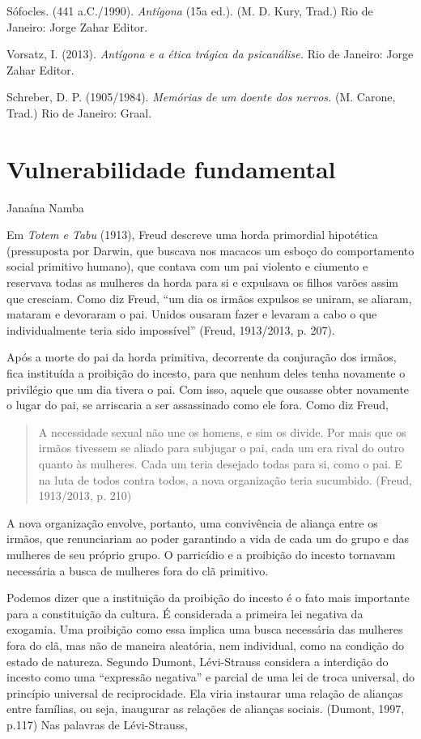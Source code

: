 Sófocles. (441 a.C./1990). \emph{Antígona} (15a ed.). (M. D. Kury,
Trad.) Rio de Janeiro: Jorge Zahar Editor.

Vorsatz, I. (2013). \emph{Antígona e a ética trágica da psicanálise.}
Rio de Janeiro: Jorge Zahar Editor.

Schreber, D. P. (1905/1984). \emph{Memórias de um doente dos nervos.}
(M. Carone, Trad.) Rio de Janeiro: Graal.



\chapter*{Vulnerabilidade fundamental}
Janaína Namba

Em \emph{Totem e Tabu} (1913), Freud descreve uma horda primordial
hipotética (pressuposta por Darwin, que buscava nos macacos um esboço do
comportamento social primitivo humano), que contava com um pai violento
e ciumento e reservava todas as mulheres da horda para si e expulsava os
filhos varões assim que cresciam. Como diz Freud, ``um dia os irmãos
expulsos se uniram, se aliaram, mataram e devoraram o pai. Unidos
ousaram fazer e levaram a cabo o que individualmente teria sido
impossível'' (Freud, 1913/2013, p. 207).

Após a morte do pai da horda primitiva, decorrente da conjuração dos
irmãos, fica instituída a proibição do incesto, para que nenhum deles
tenha novamente o privilégio que um dia tivera o pai. Com isso, aquele
que ousasse obter novamente o lugar do pai, se arriscaria a ser
assassinado como ele fora. Como diz Freud,

\begin{quote}
A necessidade sexual não une os homens, e sim os divide. Por mais que os
irmãos tivessem se aliado para subjugar o pai, cada um era rival do
outro quanto às mulheres. Cada um teria desejado todas para si, como o
pai. E na luta de todos contra todos, a nova organização teria
sucumbido. (Freud, 1913/2013, p. 210)
\end{quote}

A nova organização envolve, portanto, uma convivência de aliança entre
os irmãos, que renunciariam ao poder garantindo a vida de cada um do
grupo e das mulheres de seu próprio grupo. O parricídio e a proibição do
incesto tornavam necessária a busca de mulheres fora do clã primitivo.

Podemos dizer que a instituição da proibição do incesto é o fato mais
importante para a constituição da cultura. É considerada a primeira lei
negativa da exogamia. Uma proibição como essa implica uma busca
necessária das mulheres fora do clã, mas não de maneira aleatória, nem
individual, como na condição do estado de natureza. Segundo Dumont,
Lévi-Strauss considera a interdição do incesto como uma ``expressão
negativa'' e parcial de uma lei de troca universal, do princípio
universal de reciprocidade. Ela viria instaurar uma relação de alianças
entre famílias, ou seja, inaugurar as relações de alianças sociais.
(Dumont, 1997, p.117) Nas palavras de Lévi-Strauss,

